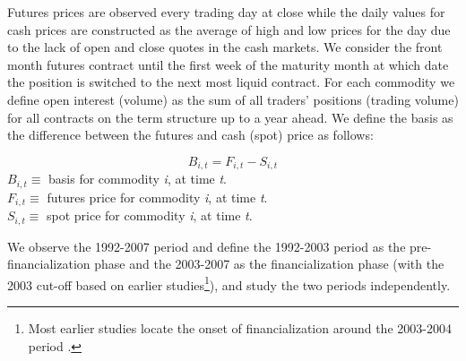 \documentclass[12pt,]{article}
\let\rmarkdownfootnote\footnote%
\def\footnote{\protect\rmarkdownfootnote}
\begin{document}
Futures prices are observed every trading day at close while the daily
values for cash prices are constructed as the average of high and low
prices for the day due to the lack of open and close quotes in the cash
markets. We consider the front month futures contract until the first
week of the maturity month at which date the position is switched to the
next most liquid contract. For each commodity we define open interest
(volume) as the sum of all traders' positions (trading volume) for all
contracts on the term structure up to a year ahead. We define the basis
as the difference between the futures and cash (spot) price as follows:

\[B_{i, t}=F_{i, t}-S_{i, t}\] \(B_{i, t}\equiv\) basis for commodity
\textit{i}, at time \textit{t}.\\
\(F_{i, t}\equiv\) futures price for commodity \textit{i}, at time
\textit{t}.\\
\(S_{i, t}\equiv\) spot price for commodity \textit{i}, at time
\textit{t}.

We observe the 1992-2007 period and define the 1992-2003 period as the
pre-financialization phase and the 2003-2007 as the financialization
phase (with the 2003 cut-off based on earlier studies\footnote{Most
  earlier studies locate the onset of financialization around the
  2003-2004 period \citep[\citet{cheng_financialization_2014},
  \citet{hamilton_effects_2015}, \citet{irwin_index_2011},
  \citet{irwin_financialization_2012}, \citet{irwin_testing_2012},
  \citet{tang_index_2012}]{basak_model_2016}.}), and study the two
periods independently.
\end{document}
